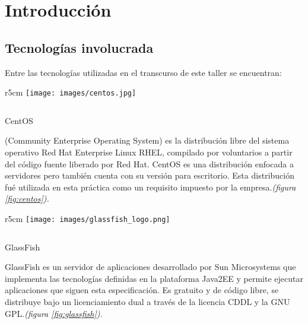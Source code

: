 \chapter{Introducción}

\section{Tecnologías involucrada}

Entre las tecnologías utilizadas en el transcurso de este taller se encuentran:
\newline
\newline

\begin{wrapfigure}{r}{5cm}
\texttt{[image: images/centos.jpg]}
\caption{CentOS.}
\label {fig:centos}
\vspace{1cm}
\end{wrapfigure}
$ $ 
\vspace{-1.5cm}

\begin{description}
\item CentOS

(Community Enterprise Operating System) es la distribución libre del sistema operativo  Red Hat Enterprise Linux RHEL, compilado por voluntarios a partir del código fuente liberado por Red Hat. CentOS es una distribución enfocada a servidores pero también cuenta con su versión para escritorio. Esta distribución fué utilizada en esta práctica como un requisito impuesto por la empresa.\emph{(figura \ref{fig:centos}).}
\end{description}




\begin{wrapfigure}{r}{5cm}
\texttt{[image: images/glassfish\_logo.png]}
\caption{GlassFish.}
\label {fig:glassfish}

\end{wrapfigure}
$ $ 
\vspace{-0.5cm}
\newline

\begin{description}
\item GlassFish

GlassFish es un servidor de aplicaciones desarrollado por Sun Microsystems que implementa las tecnologías definidas en la plataforma Java2EE y permite ejecutar aplicaciones que siguen esta especificación. Es gratuito y de código libre, se distribuye bajo un licenciamiento dual a través de la licencia CDDL y la GNU GPL.\emph{(figura \ref{fig:glassfish}).}
\end{description}


